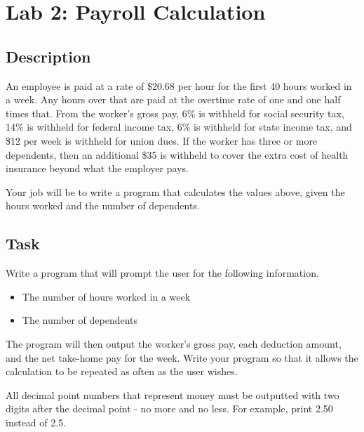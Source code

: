 \section*{Lab 2: Payroll Calculation}
\subsection*{Description}
An employee is paid at a rate of \$20.68 per hour for the first 40 hours worked in a week. Any hours over that are paid at the overtime rate of one and one half times that. From the worker’s gross pay, 6\% is withheld for social security tax, 14\% is withheld for federal income tax, 6\% is withheld for state income tax, and \$12 per week is withheld for union dues. If the worker has three or more dependents, then an additional \$35 is withheld to cover the extra cost of health insurance beyond what the employer pays.\par
Your job will be to write a program that calculates the values above, given the hours worked and the number of dependents.

\subsection*{Task}
Write a program that will prompt the user for the following information.
\begin{itemize}
    \item The number of hours worked in a week
    \item The number of dependents
\end{itemize}
The program will then output the worker's gross pay, each deduction amount, and the net take-home pay for the week. Write your program so that it allows the calculation to be repeated as often as the user wishes.\par
All decimal point numbers that represent money must be outputted with two digits after the decimal point - no more and no less. For example, print 2.50 instead of 2.5.

